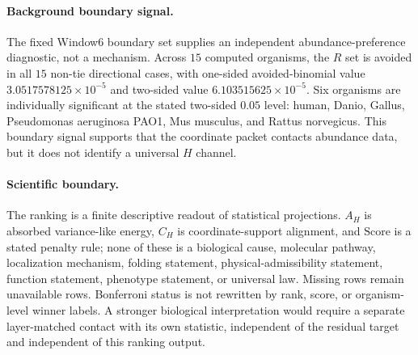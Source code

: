 \paragraph{Background boundary signal.}
The fixed Window6 boundary set supplies an independent abundance-preference diagnostic, not a mechanism.  Across $15$ computed organisms, the $R$ set is avoided in all $15$ non-tie directional cases, with one-sided avoided-binomial value $3.0517578125\times 10^{-5}$ and two-sided value $6.103515625\times 10^{-5}$.  Six organisms are individually significant at the stated two-sided $0.05$ level: human, Danio, Gallus, Pseudomonas aeruginosa PAO1, Mus musculus, and Rattus norvegicus.  This boundary signal supports that the coordinate packet contacts abundance data, but it does not identify a universal $H$ channel.

\paragraph{Scientific boundary.}
The ranking is a finite descriptive readout of statistical projections.  $A_H$ is absorbed variance-like energy, $C_H$ is coordinate-support alignment, and $\mathrm{Score}$ is a stated penalty rule; none of these is a biological cause, molecular pathway, localization mechanism, folding statement, physical-admissibility statement, function statement, phenotype statement, or universal law.  Missing rows remain unavailable rows.  Bonferroni status is not rewritten by rank, score, or organism-level winner labels.  A stronger biological interpretation would require a separate layer-matched contact with its own statistic, independent of the residual target and independent of this ranking output.

